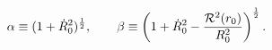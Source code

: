 \begin{equation}
\label{alpabeta2} \alpha\equiv(1+\dot{R}_{0}^2)^\frac{1}{2}
,\quad\quad  \beta\equiv\left(1+\dot{R}_{0}^2 -\frac{{\cal R}^2
(r_{0})}{R_{0}^2}\right)^\frac{1}{2}.
\end{equation}

